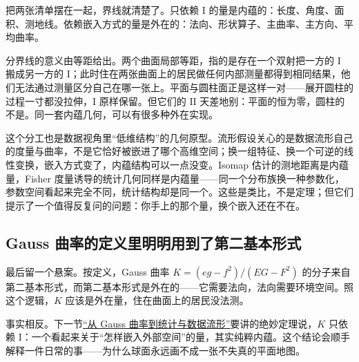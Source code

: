 把两张清单摆在一起，界线就清楚了。只依赖 \(\mathrm{I}\) 的量是内蕴的：长度、角度、面积、测地线。依赖嵌入方式的量是外在的：法向、形状算子、主曲率、主方向、平均曲率。

分界线的意义由等距给出。两个曲面局部等距，指的是存在一个双射把一方的 \(\mathrm{I}\) 搬成另一方的 \(\mathrm{I}\)；此时住在两张曲面上的居民做任何内部测量都得到相同结果，他们无法通过测量区分自己在哪一张上。平面与圆柱面正是这样一对——展开圆柱的过程一寸都没拉伸，\(\mathrm{I}\) 原样保留。但它们的 \(\mathrm{II}\) 天差地别：平面的恒为零，圆柱的不是。同一套内蕴几何，可以有很多种外在实现。

这个分工也是数据视角里``低维结构''的几何原型。流形假设关心的是数据流形自己的度量与曲率，不是它恰好被嵌进了哪个高维空间；换一组特征、换一个可逆的线性变换，嵌入方式变了，内蕴结构可以一点没变。Isomap 估计的测地距离是内蕴量，Fisher 度量诱导的统计几何同样是内蕴量——同一个分布族换一种参数化，参数空间看起来完全不同，统计结构却是同一个。这些是类比，不是定理；但它们提示了一个值得反复问的问题：你手上的那个量，换个嵌入还在不在。

\subsection{Gauss 曲率的定义里明明用到了第二基本形式}

最后留一个悬案。按定义，Gauss 曲率 \(K=(eg-f^{2})/(EG-F^{2})\) 的分子来自第二基本形式，而第二基本形式是外在的——它需要法向，法向需要环境空间。照这个逻辑，\(K\) 应该是外在量，住在曲面上的居民没法测。

事实相反。下一节\hyperref[sec:12-Real-Analysis-Support/11-Curve-and-Surface-Geometry/03]{``从 Gauss 曲率到统计与数据流形''}要讲的绝妙定理说，\(K\) 只依赖 \(\mathrm{I}\)：一个看起来关于``怎样嵌入外部空间''的量，其实纯粹内蕴。这个结论会顺手解释一件日常的事——为什么球面永远画不成一张不失真的平面地图。
